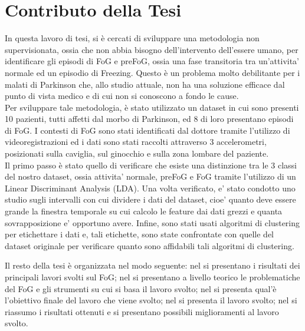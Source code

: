 \section{Contributo della Tesi}\label{cap1:Contributo della Tesi}
In questa lavoro di tesi, si è cercati di sviluppare una metodologia non supervisionata, ossia che non abbia bisogno dell'intervento dell'essere umano, per identificare gli episodi di FoG e preFoG, ossia una fase transitoria tra un'attivita' normale ed un episodio di Freezing. Questo è un problema molto debilitante per i malati di Parkinson che, allo studio attuale, non ha una soluzione efficace dal punto di vista medico e di cui non si conoscono a fondo le cause.\\
Per sviluppare tale metodologia, è stato utilizzato un dataset in cui sono presenti 10 pazienti, tutti affetti dal morbo di Parkinson, ed 8 di loro presentano episodi di FoG. I contesti di FoG sono stati identificati dal dottore tramite l'utilizzo di videoregistrazioni ed i dati sono stati raccolti attraverso 3 accelerometri, posizionati sulla caviglia, sul ginocchio e sulla zona lombare del paziente.\\
Il primo passo è stato quello di verificare che esiste una distinzione tra le 3 classi del nostro dataset, ossia attivita' normale, preFoG e FoG tramite l'utilizzo di un Linear Discriminant Analysis (LDA). Una volta verificato, e' stato condotto uno studio sugli intervalli con cui dividere i dati del dataset, cioe' quanto deve essere grande la finestra temporale su cui calcolo le feature dai dati grezzi e quanta sovrapposizione e' opportuno avere. Infine, sono stati usati algoritmi di clustering per etichettare i dati e, tali etichette, sono state confrontate con quelle del dataset originale per verificare quanto sono affidabili tali algoritmi di clustering.


Il resto della tesi è organizzata nel modo seguente: nel \textbf{} si presentano i risultati dei principali lavori svolti sul FoG; nel \textbf{} si presentano a livello teorico le problematiche del FoG e gli strumenti su cui si basa il lavoro svolto; nel \textbf{} si presenta qual'è l'obiettivo finale del lavoro che viene svolto; nel \textbf{} si presenta il lavoro svolto; nel \textbf{} si riassumo i risultati ottenuti e si presentano possibili miglioramenti al lavoro svolto.
 